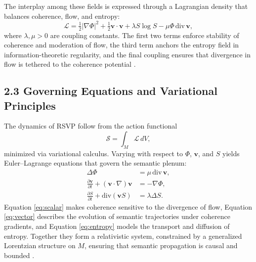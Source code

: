 \documentclass[12pt]{article}
\begin{document}
The interplay among these fields is expressed through a Lagrangian density that 
balances coherence, flow, and entropy:
\[
\mathcal{L} = \tfrac{1}{2} |\nabla \Phi|^2 
+ \tfrac{1}{2} \mathbf{v} \cdot \mathbf{v} 
+ \lambda S \log S 
- \mu \Phi \, \mathrm{div} \,\mathbf{v},
\]
where \(\lambda, \mu > 0\) are coupling constants. The first two terms enforce stability 
of coherence and moderation of flow, the third term anchors the entropy field in 
information-theoretic regularity, and the final coupling ensures that divergence in 
flow is tethered to the coherence potential \citep{atiyah1969, jaynes2003}.

\subsection*{2.3 Governing Equations and Variational Principles}
The dynamics of RSVP follow from the action functional
\[
\mathcal{S} = \int_{M} \mathcal{L} \, dV,
\]
minimized via variational calculus. Varying with respect to \(\Phi\), \(\mathbf{v}\), and \(S\) 
yields Euler–Lagrange equations that govern the semantic plenum:
\begin{align}
\Delta \Phi &= \mu \,\mathrm{div}\,\mathbf{v}, \label{eq:scalar} \\
\frac{\partial \mathbf{v}}{\partial t} + (\mathbf{v} \cdot \nabla)\mathbf{v} &= -\nabla \Phi, \label{eq:vector} \\
\frac{\partial S}{\partial t} + \mathrm{div}(\mathbf{v}S) &= \lambda \Delta S. \label{eq:entropy}
\end{align}
Equation \eqref{eq:scalar} makes coherence sensitive to the divergence of flow, 
Equation \eqref{eq:vector} describes the evolution of semantic trajectories under 
coherence gradients, and Equation \eqref{eq:entropy} models the transport and diffusion 
of entropy. Together they form a relativistic system, constrained by a generalized 
Lorentzian structure on \(M\), ensuring that semantic propagation is causal and bounded 
\citep{baez2011}.
\end{document}

